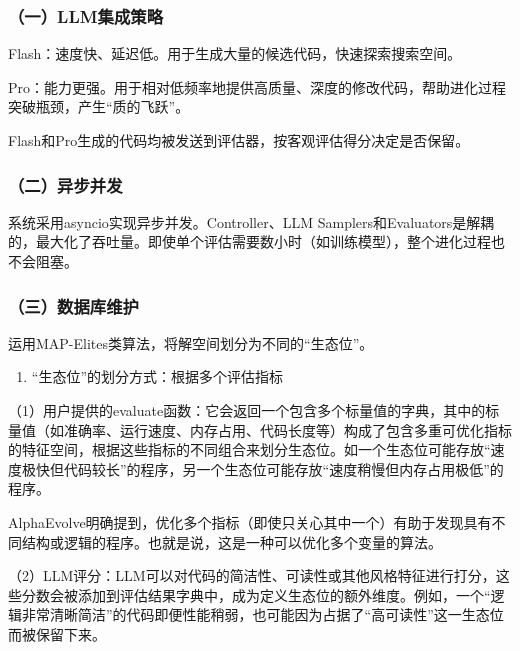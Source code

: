 \hypertarget{ux4e00llmux96c6ux6210ux7b56ux7565}{%
\subsubsection{（一）LLM集成策略}\label{ux4e00llmux96c6ux6210ux7b56ux7565}}

Flash：速度快、延迟低。用于生成大量的候选代码，快速探索搜索空间。

Pro：能力更强。用于相对低频率地提供高质量、深度的修改代码，帮助进化过程突破瓶颈，产生``质的飞跃''。

Flash和Pro生成的代码均被发送到评估器，按客观评估得分决定是否保留。

\hypertarget{ux4e8cux5f02ux6b65ux5e76ux53d1}{%
\subsubsection{（二）异步并发}\label{ux4e8cux5f02ux6b65ux5e76ux53d1}}

系统采用asyncio实现异步并发。Controller、LLM Samplers和Evaluators是解耦的，最大化了吞吐量。即使单个评估需要数小时（如训练模型），整个进化过程也不会阻塞。

\hypertarget{ux4e09ux6570ux636eux5e93ux7ef4ux62a4}{%
\subsubsection{（三）数据库维护}\label{ux4e09ux6570ux636eux5e93ux7ef4ux62a4}}

运用MAP-Elites类算法，将解空间划分为不同的``生态位''。

\begin{enumerate}
\def\labelenumi{\arabic{enumi}.}
\tightlist
\item
  ``生态位''的划分方式：根据多个评估指标
\end{enumerate}

（1）用户提供的evaluate函数：它会返回一个包含多个标量值的字典，其中的标量值（如准确率、运行速度、内存占用、代码长度等）构成了包含多重可优化指标的特征空间，根据这些指标的不同组合来划分生态位。如一个生态位可能存放``速度极快但代码较长''的程序，另一个生态位可能存放``速度稍慢但内存占用极低''的程序。

AlphaEvolve明确提到，优化多个指标（即使只关心其中一个）有助于发现具有不同结构或逻辑的程序。也就是说，这是一种可以优化多个变量的算法。

（2）LLM评分：LLM可以对代码的简洁性、可读性或其他风格特征进行打分，这些分数会被添加到评估结果字典中，成为定义生态位的额外维度。例如，一个``逻辑非常清晰简洁''的代码即便性能稍弱，也可能因为占据了``高可读性''这一生态位而被保留下来。

